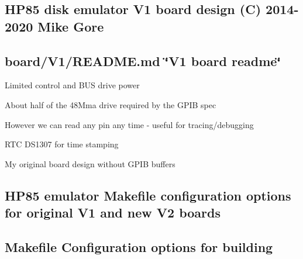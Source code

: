 \subsection*{H\+P85 disk emulator V1 board design (C) 2014-\/2020 Mike Gore}

\subsection*{board/\+V1/\+R\+E\+A\+D\+M\+E.\+md \char`\"{}\+V1 board readme\char`\"{}}


\begin{DoxyItemize}
\item Limited control and B\+US drive power
\begin{DoxyItemize}
\item About half of the 48\+Mma drive required by the G\+P\+IB spec
\item However we can read any pin any time -\/ useful for tracing/debugging
\end{DoxyItemize}
\item R\+TC D\+S1307 for time stamping
\item My original board design without G\+P\+IB buffers
\end{DoxyItemize}





\subsection*{H\+P85 emulator Makefile configuration options for original V1 and new V2 boards}

\subsection*{Makefile Configuration options for building}


